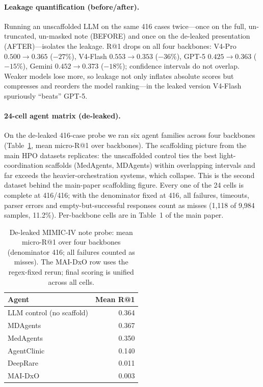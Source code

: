 \documentclass[letterpaper]{article} %
\begin{document}
\paragraph{Leakage quantification (before/after).}
Running an unscaffolded LLM on the same 416 cases twice---once on the full,
un-truncated, un-masked note (BEFORE) and once on the de-leaked presentation
(AFTER)---isolates the leakage. R@1 drops on all four backbones:
V4-Pro $0.500\!\rightarrow\!0.365$ ($-27\%$), V4-Flash
$0.553\!\rightarrow\!0.353$ ($-36\%$), GPT-5 $0.425\!\rightarrow\!0.363$
($-15\%$), Gemini $0.452\!\rightarrow\!0.373$ ($-18\%$); confidence intervals do
not overlap. Weaker models lose more, so leakage not only inflates absolute
scores but compresses and reorders the model ranking---in the leaked version
V4-Flash spuriously ``beats'' GPT-5.

\paragraph{24-cell agent matrix (de-leaked).}
On the de-leaked 416-case probe we ran six agent families across four backbones
(Table~\ref{tab:mimicmatrix}, mean micro-R@1 over backbones). The scaffolding
picture from the main HPO datasets replicates: the unscaffolded control ties the
best light-coordination scaffolds (MedAgents, MDAgents) within overlapping
intervals and far exceeds the heavier-orchestration systems, which collapse.
This is the second dataset behind the main-paper scaffolding figure. Every one of
the 24 cells is complete at 416/416; with the denominator fixed at 416, all
failures, timeouts, parser errors and empty-but-successful responses count as
misses (1,118 of 9,984 samples, 11.2\%). Per-backbone cells are in Table~1 of
the main paper.

\begin{table}[h]
\centering
\scriptsize
\setlength{\tabcolsep}{5pt}
\caption{De-leaked MIMIC-IV note probe: mean micro-R@1 over four backbones
(denominator 416; all failures counted as misses). The MAI-DxO row uses the
regex-fixed rerun; final scoring is unified across all cells.}
\label{tab:mimicmatrix}
\begin{tabular}{@{}lr@{}}
\toprule
Agent & Mean R@1 \\
\midrule
LLM control (no scaffold) & 0.364 \\
MDAgents & 0.367 \\
MedAgents & 0.350 \\
AgentClinic & 0.140 \\
DeepRare & 0.011 \\
MAI-DxO & 0.003 \\
\bottomrule
\end{tabular}
\end{table}
\end{document}
